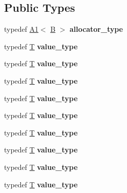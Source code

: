 \subsection*{Public Types}
\begin{DoxyCompactItemize}
\item 
\mbox{\label{struct_b_a48af7d9efb150839768993cd65d1d4db}} 
typedef \mbox{\hyperlink{struct_a1}{A1}}$<$ \mbox{\hyperlink{struct_b}{B}} $>$ {\bfseries allocator\+\_\+type}
\item 
\mbox{\label{struct_b_ae735c4dad3883f0931f71f33dc36f3c2}} 
typedef \mbox{\hyperlink{struct_t}{T}} {\bfseries value\+\_\+type}
\item 
\mbox{\label{struct_b_ae735c4dad3883f0931f71f33dc36f3c2}} 
typedef \mbox{\hyperlink{struct_t}{T}} {\bfseries value\+\_\+type}
\item 
\mbox{\label{struct_b_ae735c4dad3883f0931f71f33dc36f3c2}} 
typedef \mbox{\hyperlink{struct_t}{T}} {\bfseries value\+\_\+type}
\item 
\mbox{\label{struct_b_ae735c4dad3883f0931f71f33dc36f3c2}} 
typedef \mbox{\hyperlink{struct_t}{T}} {\bfseries value\+\_\+type}
\item 
\mbox{\label{struct_b_ae735c4dad3883f0931f71f33dc36f3c2}} 
typedef \mbox{\hyperlink{struct_t}{T}} {\bfseries value\+\_\+type}
\item 
\mbox{\label{struct_b_ae735c4dad3883f0931f71f33dc36f3c2}} 
typedef \mbox{\hyperlink{struct_t}{T}} {\bfseries value\+\_\+type}
\item 
\mbox{\label{struct_b_ae735c4dad3883f0931f71f33dc36f3c2}} 
typedef \mbox{\hyperlink{struct_t}{T}} {\bfseries value\+\_\+type}
\item 
\mbox{\label{struct_b_ae735c4dad3883f0931f71f33dc36f3c2}} 
typedef \mbox{\hyperlink{struct_t}{T}} {\bfseries value\+\_\+type}
\item 
\mbox{\label{struct_b_ae735c4dad3883f0931f71f33dc36f3c2}} 
typedef \mbox{\hyperlink{struct_t}{T}} {\bfseries value\+\_\+type}
\item 

\end{DoxyCompactItemize}
